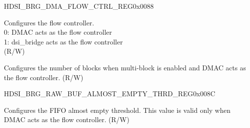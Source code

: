 \begin{register}{H}{DSI\_BRG\_DMA\_FLOW\_CTRL\_REG}{0x0088}\label{regdesc:DSIBRGDMAFLOWCTRLREG}
%
%
%
%
\regnewline%
\begin{regdesc}\begin{reglist}
\label{fielddesc:DSIBRGDSIDMAFLOWCONTROLLER}\item [DSI\_BRG\_DSI\_DMA\_FLOW\_CONTROLLER] Configures the flow controller. \\0: DMAC acts as the flow controller\\1: dsi\_bridge acts as the flow controller \\(R/W)
\label{fielddesc:DSIBRGDMAFLOWMULTIBLKNUM}\item [DSI\_BRG\_DMA\_FLOW\_MULTIBLK\_NUM] Configures the number of blocks when multi-block is enabled and DMAC acts as the flow controller. (R/W)
\end{reglist}\end{regdesc}
\end{register}


\begin{register}{H}{DSI\_BRG\_RAW\_BUF\_ALMOST\_EMPTY\_THRD\_REG}{0x008C}\label{regdesc:DSIBRGRAWBUFALMOSTEMPTYTHRDREG}
%
%
\regnewline%
\begin{regdesc}\begin{reglist}
\label{fielddesc:DSIBRGDSIRAWBUFALMOSTEMPTYTHRD}\item [DSI\_BRG\_DSI\_RAW\_BUF\_ALMOST\_EMPTY\_THRD] Configures the FIFO almost empty threshold. This value is valid only when DMAC acts as the flow controller. (R/W)
\end{reglist}\end{regdesc}
\end{register}



